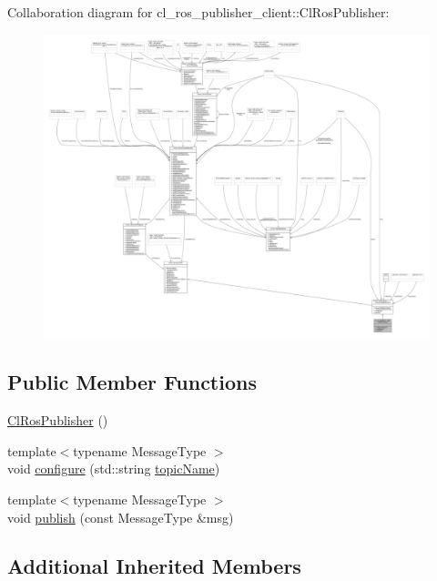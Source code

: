 Collaboration diagram for cl\+\_\+ros\+\_\+publisher\+\_\+client\+:\+:Cl\+Ros\+Publisher\+:
\nopagebreak
\begin{figure}[H]
\begin{center}
\leavevmode
\includegraphics[width=350pt]{classcl__ros__publisher__client_1_1ClRosPublisher__coll__graph}
\end{center}
\end{figure}
\subsection*{Public Member Functions}
\begin{DoxyCompactItemize}
\item 
\hyperlink{classcl__ros__publisher__client_1_1ClRosPublisher_afc14b2d46435e29190a3c0d724509845}{Cl\+Ros\+Publisher} ()
\item 
{\footnotesize template$<$typename Message\+Type $>$ }\\void \hyperlink{classcl__ros__publisher__client_1_1ClRosPublisher_a1491d19d706859aa7cc28798fe895007}{configure} (std\+::string \hyperlink{classsmacc_1_1client__bases_1_1SmaccPublisherClient_a8b8d98aef9b3b3a441005d2cb17b4fcc}{topic\+Name})
\item 
{\footnotesize template$<$typename Message\+Type $>$ }\\void \hyperlink{classcl__ros__publisher__client_1_1ClRosPublisher_ad97b6c1e29e56a2e4a5a6554a93be67c}{publish} (const Message\+Type \&msg)
\end{DoxyCompactItemize}
\subsection*{Additional Inherited Members}


